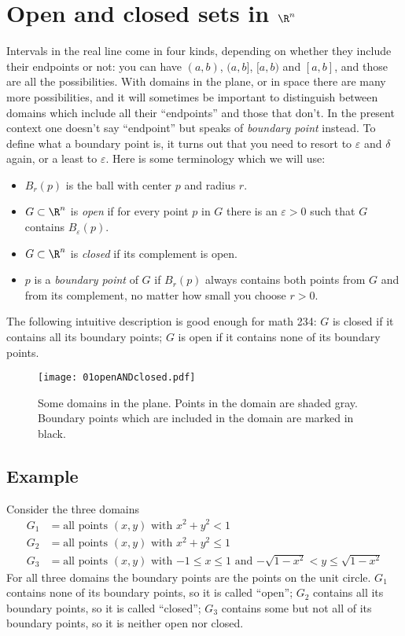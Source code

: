 \section{Open and closed sets in $\R^n$}    %
Intervals in the real line come in four kinds, depending on whether
they include their endpoints or not: you can have $(a,b)$, $(a, b]$,
$[a, b)$ and $[a,b]$, and those are all the possibilities.  With
domains in the plane, or in space there are many more possibilities,
and it will sometimes be important to distinguish between domains
which include all their ``endpoints'' and those that don't.  In the
present context one doesn't say ``endpoint'' but speaks of
\emph{boundary point} instead.  To define what a boundary point is, it
turns out that you need to resort to $\varepsilon$ and $\delta$ again,
or a least to $\varepsilon$.
Here is some terminology which we will use:
\begin{itemize}
\item $B_r(p)$ is the ball with center $p$ and radius $r$.

\item $G\subset \R^n$ is \emph{open} if for every point $p$ in $G$ there is an
  $\varepsilon>0$ such that $G$ contains $B_\varepsilon(p)$.

\item $G\subset\R^n$ is \emph{closed} if its complement is open.

\item $p$ is a \emph{boundary point} of $G$ if $B_r(p)$ always contains both
  points from $G$ and from its complement, no matter how small you
  choose $r>0$.
\end{itemize}
The following intuitive description is good enough for math 234: $G$
is closed if it contains all its boundary points; $G$ is open if it
contains none of its boundary points.

\begin{figure}[ht]\centering
  \texttt{[image: 01openANDclosed.pdf]}
  \caption{Some domains in the plane.  Points in the domain are shaded
  gray.  Boundary points which are included in the domain are marked
  in black.}
  \label{fig:01openANDclosed}
\end{figure}

\subsection{Example}\label{sec:openClosedExample} Consider the three domains    %
\begin{align*}
  G_1 &= \text{all points $(x, y)$ with $x^2+y^2<1$}\\
  G_2 &= \text{all points $(x, y)$ with $x^2+y^2\le1$}\\
  G_3 &= \text{all points $(x, y)$ with $-1\leq x\leq 1$ and
  $-\sqrt{1-x^2}<y\leq \sqrt{1-x^2}$}
\end{align*}
For all three domains the boundary points are the points on the unit
circle.  $G_1$ contains none of its boundary points, so it is called
``open'';  $G_2$ contains all its boundary points, so it is called
``closed'';  $G_3$ contains some but not all of its boundary points,
so it is neither open nor closed.



